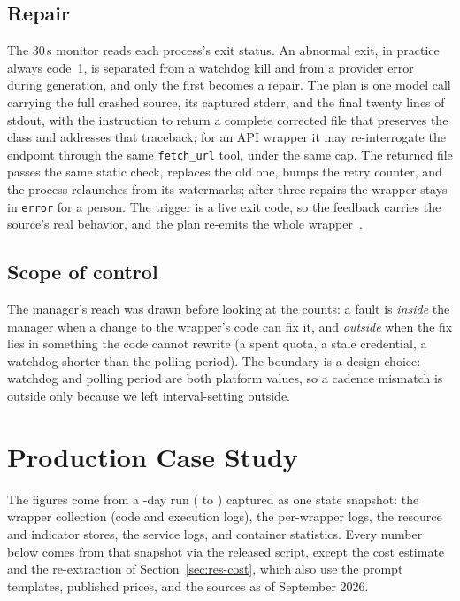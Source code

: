 \documentclass[conference]{IEEEtran}
\begin{document}
\subsection{Repair}
\label{sec:heal}
The 30\,s monitor reads each process's exit status. An abnormal exit, in practice
always code~1, is separated from a watchdog kill and from a provider error during
generation, and only the first becomes a repair. The plan is one model call carrying
the full crashed source, its captured stderr, and the final twenty lines of stdout,
with the instruction to return a complete corrected file that preserves the class and
addresses that traceback; for an API wrapper it may re-interrogate the endpoint
through the same \texttt{fetch\_url} tool, under the same cap. The returned file passes
the same static check, replaces the old one, bumps the retry counter, and the process
relaunches from its watermarks; after three repairs the wrapper stays in
\texttt{error} for a person. The trigger is a live exit code, so the
feedback carries the source's real behavior, and the plan re-emits the whole
wrapper~\cite{chen2024selfdebug,olausson2024selfrepair}.

\subsection{Scope of control}
\label{sec:scope}
The manager's reach was drawn before looking at the counts: a fault is \emph{inside} the manager when a change to the wrapper's code can
fix it, and \emph{outside} when the fix lies in something the code cannot rewrite (a
spent quota, a stale credential, a watchdog shorter than the polling period). The
boundary is a design choice: watchdog and polling period are both platform values, so
a cadence mismatch is outside only because we left interval-setting outside.

\section{Production Case Study}
\label{sec:results}

The figures come from a \deploymentDays{}-day run (\deploymentStart{} to
\deploymentEnd{}) captured as one state snapshot: the wrapper collection (code and
execution logs), the per-wrapper logs, the resource and indicator stores, the service
logs, and container statistics.
Every number below comes from that snapshot via the released script, except the
cost estimate and the re-extraction of Section~\ref{sec:res-cost}, which also use
the prompt templates, published prices, and the sources as of September 2026.
\end{document}
